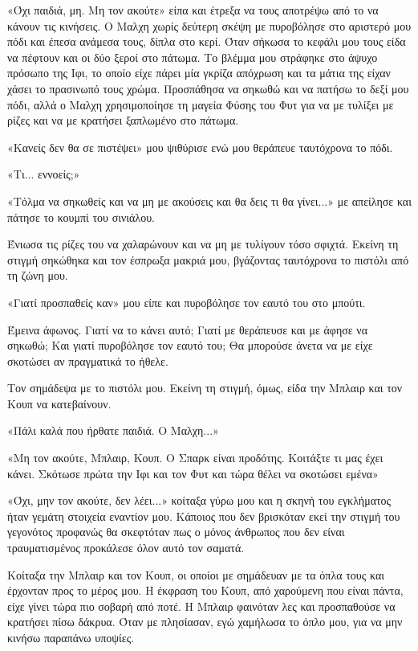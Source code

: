\documentclass[12pt,twoside, openany]{book}
\begin{document}
«Όχι παιδιά, μη. Μη τον ακούτε» είπα και έτρεξα να τους αποτρέψω από το να κάνουν τις κινήσεις. Ο Μαλχη χωρίς δεύτερη σκέψη με πυροβόλησε στο αριστερό μου πόδι και έπεσα ανάμεσα τους, δίπλα στο κερί. Όταν σήκωσα το κεφάλι μου τους είδα να πέφτουν και οι δύο ξεροί στο πάτωμα. Το βλέμμα μου στράφηκε στο άψυχο πρόσωπο της Ιφι, το οποίο είχε πάρει μία γκρίζα απόχρωση και τα μάτια της είχαν χάσει το πρασινωπό τους χρώμα. Προσπάθησα να σηκωθώ και να πατήσω το δεξί μου πόδι, αλλά ο Μαλχη χρησιμοποίησε τη μαγεία Φύσης του Φυτ για να με τυλίξει με ρίζες και να με κρατήσει ξαπλωμένο στο πάτωμα.

«Κανείς δεν θα σε πιστέψει» μου ψιθύρισε ενώ μου θεράπευε ταυτόχρονα το πόδι.

«Τι... εννοείς;»

«Τόλμα να σηκωθείς και να μη με ακούσεις και θα δεις τι θα γίνει...» με απείλησε και πάτησε το κουμπί του σινιάλου.

Ένιωσα τις ρίζες του να χαλαρώνουν και να μη με τυλίγουν τόσο σφιχτά. Εκείνη τη στιγμή σηκώθηκα και τον έσπρωξα μακριά μου, βγάζοντας ταυτόχρονα το πιστόλι από τη ζώνη μου.

«Γιατί προσπαθείς καν» μου είπε και πυροβόλησε τον εαυτό του στο μπούτι.

Έμεινα άφωνος. Γιατί να το κάνει αυτό; Γιατί με θεράπευσε και με άφησε να σηκωθώ; Και γιατί πυροβόλησε τον εαυτό του; Θα μπορούσε άνετα να με είχε σκοτώσει αν πραγματικά το ήθελε.

Τον σημάδεψα με το πιστόλι μου. Εκείνη τη στιγμή, όμως, είδα την Μπλαιρ και τον Κουπ να κατεβαίνουν.

«Πάλι καλά που ήρθατε παιδιά. Ο Μαλχη...»

«Μη τον ακούτε, Μπλαιρ, Κουπ. Ο Σπαρκ είναι προδότης. Κοιτάξτε τι μας έχει κάνει. Σκότωσε πρώτα την Ιφι και τον Φυτ και τώρα θέλει να σκοτώσει εμένα»

«Όχι, μην τον ακούτε, δεν λέει...» κοίταξα γύρω μου και η σκηνή του εγκλήματος ήταν γεμάτη στοιχεία εναντίον μου. Κάποιος που δεν βρισκόταν εκεί την στιγμή του γεγονότος προφανώς θα σκεφτόταν πως ο μόνος άνθρωπος που δεν είναι τραυματισμένος προκάλεσε όλον αυτό τον σαματά.

Κοίταξα την Μπλαιρ και τον Κουπ, οι οποίοι με σημάδευαν με τα όπλα τους και έρχονταν προς το μέρος μου. Η έκφραση του Κουπ, από χαρούμενη που είναι πάντα, είχε γίνει τώρα πιο σοβαρή από ποτέ. Η Μπλαιρ φαινόταν λες και προσπαθούσε να κρατήσει πίσω δάκρυα. Όταν με πλησίασαν, εγώ χαμήλωσα το όπλο μου, για να μην κινήσω παραπάνω υποψίες.
\end{document}
